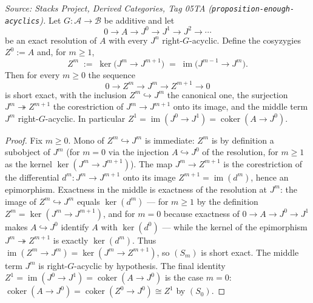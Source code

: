 \begin{lemma}
  \label{mk-lem:cosyzygy_ses}

  \textit{Source: Stacks Project, Derived Categories, Tag 05TA
  (\texttt{proposition-enough-acyclics}).}
  Let \(G : \mathcal{A} \to \mathcal{B}\) be additive and let
  \[
    0 \longrightarrow A
      \longrightarrow J^0 \longrightarrow J^1 \longrightarrow J^2
      \longrightarrow \cdots
  \]
  be an exact resolution of \(A\) with every \(J^n\) right-\(G\)-acyclic. Define the
  cosyzygies \(Z^0 := A\) and, for \(m \geq 1\),
  \[
    Z^m \;:=\; \ker\bigl(J^m \to J^{m+1}\bigr)
      \;=\; \operatorname{im}\bigl(J^{m-1} \to J^m\bigr).
  \]
  Then for every \(m \geq 0\) the sequence
  \[
    0 \longrightarrow Z^m \longrightarrow J^m \longrightarrow Z^{m+1}
      \longrightarrow 0 \tag{$S_m$}
  \]
  is short exact, with the inclusion \(Z^m \hookrightarrow J^m\) the canonical one,
  the surjection \(J^m \twoheadrightarrow Z^{m+1}\) the corestriction of
  \(J^m \to J^{m+1}\) onto its image, and the middle term \(J^m\) right-\(G\)-acyclic.
  In particular \(Z^1 = \operatorname{im}(J^0 \to J^1) = \operatorname{coker}(A \to J^0)\).
\end{lemma}

\begin{proof}
  Fix \(m \geq 0\). Mono of \(Z^m \hookrightarrow J^m\) is immediate: \(Z^m\) is by
  definition a subobject of \(J^m\) (for \(m = 0\) via the injection \(A \hookrightarrow
  J^0\) of the resolution, for \(m \geq 1\) as the kernel \(\ker(J^m \to J^{m+1})\)).
  The map \(J^m \to Z^{m+1}\) is the corestriction of the differential
  \(d^m : J^m \to J^{m+1}\) onto its image \(Z^{m+1} = \operatorname{im}(d^m)\), hence
  an epimorphism. Exactness in the middle is exactness of the resolution at \(J^m\):
  the image of \(Z^m \hookrightarrow J^m\) equals \(\ker(d^m)\) --- for \(m \geq 1\)
  by the definition \(Z^m = \ker(J^m \to J^{m+1})\), and for \(m = 0\) because
  exactness of \(0 \to A \to J^0 \to J^1\) makes \(A \hookrightarrow J^0\) identify
  \(A\) with \(\ker(d^0)\) --- while the kernel of the epimorphism
  \(J^m \twoheadrightarrow Z^{m+1}\) is exactly \(\ker(d^m)\). Thus
  \(\operatorname{im}(Z^m \to J^m) = \ker(J^m \to Z^{m+1})\), so \((S_m)\) is short
  exact. The middle term \(J^m\) is right-\(G\)-acyclic by hypothesis. The final
  identity \(Z^1 = \operatorname{im}(J^0 \to J^1) = \operatorname{coker}(A \to J^0)\)
  is the case \(m = 0\): \(\operatorname{coker}(A \to J^0) = \operatorname{coker}(Z^0 \to J^0)
  \cong Z^1\) by \((S_0)\).
\end{proof}

